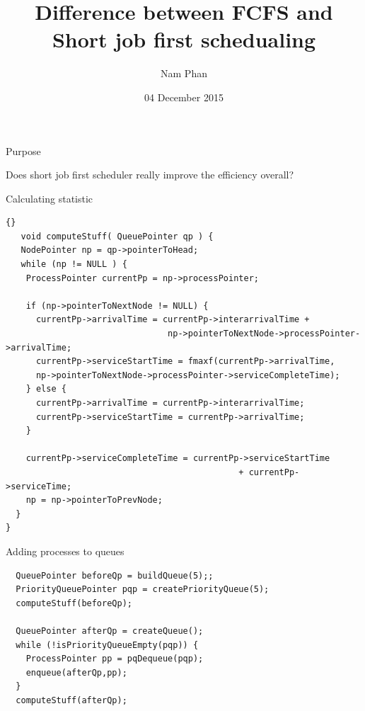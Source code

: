 \documentclass{beamer}
\title{Difference between FCFS and Short job first schedualing}
\author{Nam Phan}
\institute{Cornell College}
\date{04 December 2015}
\begin{document}
\begin{frame}
  \titlepage
\end{frame}

\begin{frame}{Purpose}
\begin{center}
  Does short job first scheduler really improve the efficiency overall?
  \end{center}
\end{frame}

\begin{frame}[fragile]{Calculating statistic}
\begin{adjustbox}{width=\textwidth}
  \begin{lstlisting}{}
   void computeStuff( QueuePointer qp ) {
   NodePointer np = qp->pointerToHead;
   while (np != NULL ) {
    ProcessPointer currentPp = np->processPointer;

    if (np->pointerToNextNode != NULL) {
      currentPp->arrivalTime = currentPp->interarrivalTime + 
                                np->pointerToNextNode->processPointer->arrivalTime;
      currentPp->serviceStartTime = fmaxf(currentPp->arrivalTime, 
      np->pointerToNextNode->processPointer->serviceCompleteTime);
    } else {
      currentPp->arrivalTime = currentPp->interarrivalTime;
      currentPp->serviceStartTime = currentPp->arrivalTime;
    }

    currentPp->serviceCompleteTime = currentPp->serviceStartTime 
                                              + currentPp->serviceTime;
    np = np->pointerToPrevNode;
  }
}
    \end{lstlisting}
\end{adjustbox}
\end{frame}


\begin{frame}[fragile]{Adding processes to queues} 
  \begin{lstlisting}
  QueuePointer beforeQp = buildQueue(5);;
  PriorityQueuePointer pqp = createPriorityQueue(5);
  computeStuff(beforeQp);
  
  QueuePointer afterQp = createQueue(); 
  while (!isPriorityQueueEmpty(pqp)) {
    ProcessPointer pp = pqDequeue(pqp);
    enqueue(afterQp,pp);
  }
  computeStuff(afterQp);
  \end{lstlisting}
\end{frame}
\end{document}

